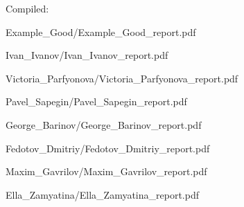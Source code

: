 \documentclass[a4paper]{article}
\begin{document}
Compiled: \DTMnow
\tableofcontents

\clearpage

{Example_Good/Example_Good_report.pdf}

{Ivan_Ivanov/Ivan_Ivanov_report.pdf}

{Victoria_Parfyonova/Victoria_Parfyonova_report.pdf}

{Pavel_Sapegin/Pavel_Sapegin_report.pdf}

{George_Barinov/George_Barinov_report.pdf}

{Fedotov_Dmitriy/Fedotov_Dmitriy_report.pdf}

{Maxim_Gavrilov/Maxim_Gavrilov_report.pdf}

{Ella_Zamyatina/Ella_Zamyatina_report.pdf}
\end{document}
